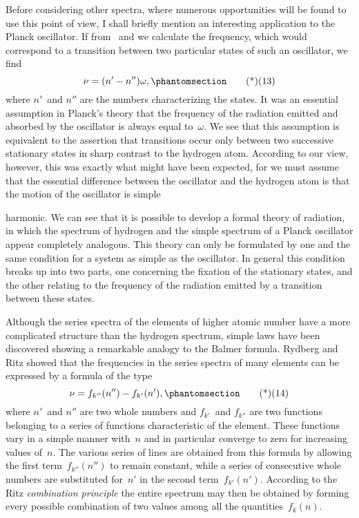 Before considering other spectra, where numerous opportunities
will be found to use this point of view, I shall briefly mention an
interesting application to the Planck oscillator. If from ~and 
we calculate the frequency, which would correspond to a transition
between two particular states of such an oscillator, we find
\[
\nu = (n' - n'')\omega,
\Tag{(13)}
\]
where $n'$~and $n''$ are the numbers characterizing the states. It was
an essential assumption in Planck's theory that the frequency of
the radiation emitted and absorbed by the oscillator is always equal
to~$\omega$. We see that this assumption is equivalent to the assertion
that transitions occur only between two successive stationary states
in sharp contrast to the hydrogen atom. According to our view,
however, this was exactly what might have been expected, for we
must assume that the essential difference between the oscillator
and the hydrogen atom is that the motion of the oscillator is simple

harmonic. We can see that it is possible to develop a formal theory
of radiation, in which the spectrum of hydrogen and the simple
spectrum of a Planck oscillator appear completely analogous. This
theory can only be formulated by one and the same condition for
a system as simple as the oscillator. In general this condition
breaks up into two parts, one concerning the fixation of the stationary
states, and the other relating to the frequency of the radiation
emitted by a transition between these states.

 Although the series spectra of the
elements of higher atomic number have a more complicated structure
than the hydrogen spectrum, simple laws have been discovered
showing a remarkable analogy to the Balmer formula. Rydberg
and Ritz showed that the frequencies in the series spectra of many
elements can be expressed by a formula of the type
\[
\nu = f_{k''}(n'') - f_{k'}(n'),
\Tag{(14)}
\]
where $n'$~and $n''$ are two whole numbers and $f_{k'}$~and $f_{k''}$ are two
functions belonging to a series of functions characteristic of the
element. These functions vary in a simple manner with~$n$ and in
particular converge to zero for increasing values of~$n$. The various
series of lines are obtained from this formula by allowing the first
term~$f_{k''}(n'')$ to remain constant, while a series of consecutive whole
numbers are substituted for~$n'$ in the second term~$f_{k'}(n')$. According
to the Ritz \emph{combination principle} the entire spectrum may then
be obtained by forming every possible combination of two values
among all the quantities~$f_{k}(n)$.

